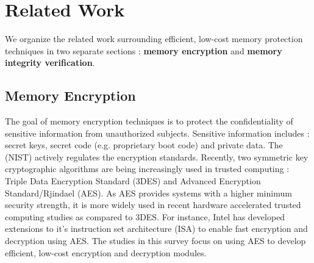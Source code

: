 \section{Related Work}
\label{sec-related}

We organize the related work surrounding efficient, low-cost memory protection
techniques in two separate sections : \textbf{memory encryption} and
\textbf{memory integrity verification}.

\subsection{Memory Encryption}
The goal of memory encryption techniques is to protect the confidentiality of
sensitive information from unauthorized subjects. Sensitive information
includes : secret keys, secret code (e.g. proprietary boot code) and private
data. The  (NIST) actively
regulates the encryption standards. Recently, two symmetric key cryptographic
algorithms are being increasingly used in trusted computing : Triple Data
Encryption Standard (3DES) and Advanced Encryption Standard/Rjindael (AES). As
AES provides systems with a higher minimum security strength, it is more widely
used in recent hardware accelerated trusted computing studies as compared to
3DES. For instance, Intel has developed extensions to it's instruction set
architecture (ISA) to enable fast encryption and decryption using AES. The
studies in this survey focus on using AES to develop efficient, low-cost
encryption and decryption modules.

